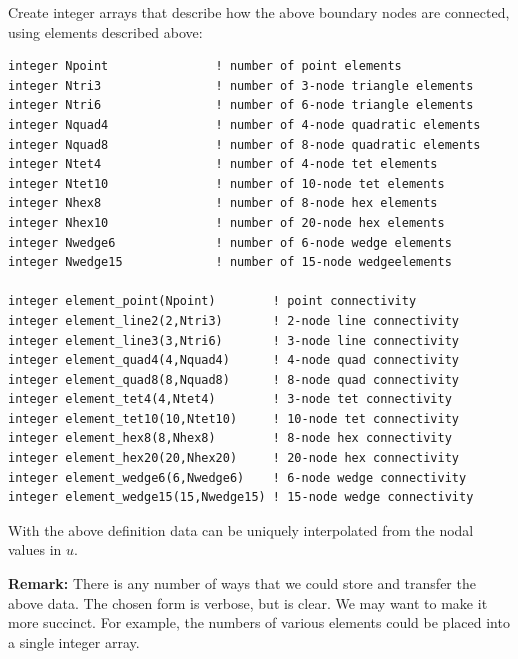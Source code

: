 \documentclass[11pt]{article}
\begin{document}
Create integer arrays that describe how the above boundary nodes are
connected, using elements described above:
\begin{verbatim}
integer Npoint               ! number of point elements
integer Ntri3                ! number of 3-node triangle elements
integer Ntri6                ! number of 6-node triangle elements
integer Nquad4               ! number of 4-node quadratic elements
integer Nquad8               ! number of 8-node quadratic elements
integer Ntet4                ! number of 4-node tet elements
integer Ntet10               ! number of 10-node tet elements
integer Nhex8                ! number of 8-node hex elements
integer Nhex10               ! number of 20-node hex elements
integer Nwedge6              ! number of 6-node wedge elements
integer Nwedge15             ! number of 15-node wedgeelements

integer element_point(Npoint)        ! point connectivity
integer element_line2(2,Ntri3)       ! 2-node line connectivity
integer element_line3(3,Ntri6)       ! 3-node line connectivity
integer element_quad4(4,Nquad4)      ! 4-node quad connectivity
integer element_quad8(8,Nquad8)      ! 8-node quad connectivity
integer element_tet4(4,Ntet4)        ! 3-node tet connectivity
integer element_tet10(10,Ntet10)     ! 10-node tet connectivity
integer element_hex8(8,Nhex8)        ! 8-node hex connectivity
integer element_hex20(20,Nhex20)     ! 20-node hex connectivity
integer element_wedge6(6,Nwedge6)    ! 6-node wedge connectivity
integer element_wedge15(15,Nwedge15) ! 15-node wedge connectivity

\end{verbatim}

With the above definition data can be uniquely interpolated from the nodal
values in $u$.

\textbf{Remark:} There is any number of ways that we could store and
transfer the above data.  The chosen form is verbose, but is clear.  We may
want to make it more succinct.  For example, the numbers of various elements
could be placed into a single integer array.  
\end{document}
